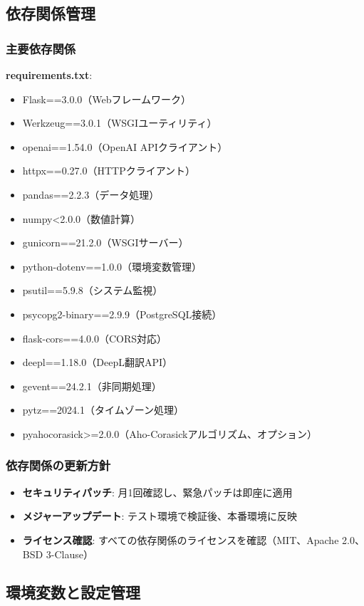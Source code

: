 \documentclass[a4paper,11pt,ja=standard,xelatex]{bxjsarticle}
\theoremstyle{definition}
\begin{document}
\subsection{依存関係管理}

\subsubsection{主要依存関係}

\textbf{requirements.txt}:
\begin{itemize}
\item Flask==3.0.0（Webフレームワーク）
\item Werkzeug==3.0.1（WSGIユーティリティ）
\item openai==1.54.0（OpenAI APIクライアント）
\item httpx==0.27.0（HTTPクライアント）
\item pandas==2.2.3（データ処理）
\item numpy<2.0.0（数値計算）
\item gunicorn==21.2.0（WSGIサーバー）
\item python-dotenv==1.0.0（環境変数管理）
\item psutil==5.9.8（システム監視）
\item psycopg2-binary==2.9.9（PostgreSQL接続）
\item flask-cors==4.0.0（CORS対応）
\item deepl==1.18.0（DeepL翻訳API）
\item gevent==24.2.1（非同期処理）
\item pytz==2024.1（タイムゾーン処理）
\item pyahocorasick>=2.0.0（Aho-Corasickアルゴリズム、オプション）
\end{itemize}

\subsubsection{依存関係の更新方針}

\begin{itemize}
\item \textbf{セキュリティパッチ}: 月1回確認し、緊急パッチは即座に適用
\item \textbf{メジャーアップデート}: テスト環境で検証後、本番環境に反映
\item \textbf{ライセンス確認}: すべての依存関係のライセンスを確認（MIT、Apache 2.0、BSD 3-Clause）
\end{itemize}

\subsection{環境変数と設定管理}
\end{document}
